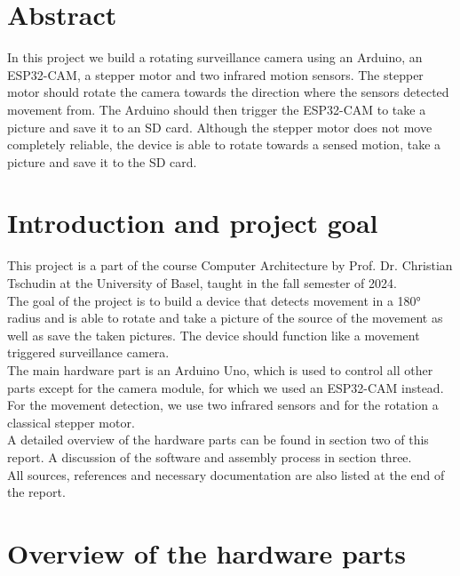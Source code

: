 \documentclass{article}
\begin{document}


\tableofcontents

\newpage

\section*{Abstract}

In this project we build a rotating surveillance camera using an Arduino, an ESP32-CAM, a stepper motor and two infrared motion sensors. The stepper motor should rotate the camera towards the direction where the sensors detected movement from. The Arduino should then trigger the ESP32-CAM to take a picture and save it to an SD card. Although the stepper motor does not move completely reliable, the device is able to rotate towards a sensed motion, take a picture and save it to the SD card.

\newpage

\section{Introduction and project goal}

This project is a part of the course Computer Architecture by Prof. Dr. Christian Tschudin at the University of Basel, taught in the fall semester of 2024.\\
The goal of the project is to build a device that detects movement in a 180° radius and is able to rotate and take a picture of the source of the movement as well as save the taken pictures. The device should function like a movement triggered surveillance camera.\\
The main hardware part is an Arduino Uno, which is used to control all other parts except for the camera module, for which we used an ESP32-CAM instead. For the movement detection, we use two infrared sensors and for the rotation a classical stepper motor.\\
A detailed overview of the hardware parts can be found in section two of this report. A discussion of the software and assembly process in section three.\\
All sources, references and necessary documentation are also listed at the end of the report.

\section{Overview of the hardware parts}
\end{document}
